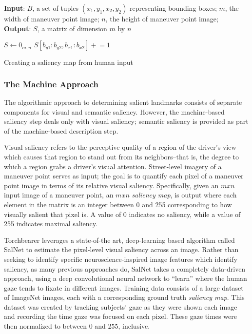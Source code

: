 \begin{algorithm}[htbp]
\textbf{Input}: $B$, a set of tuples $(x_1, y_1, x_2, y_2)$ representing bounding boxes;
$m$, the width of maneuver point image;
$n$, the height of maneuver point image; \\
\textbf{Output}: $S$, a matrix of dimension $m$ by $n$ 
\begin{algorithmic}[1]
\STATE $S\gets 0_{m,n}$
    \STATE $S[b_{y1}:b_{y2}, b_{x1}:b_{x2}] \mathrel{+}= 1$
\ENDFOR
{}
\end{algorithmic}
\caption{Creating a saliency map from human input}\label{alg:saliencyMap}
\label{alg:saliencyMap}
\end{algorithm} 

\subsubsection{The Machine Approach}
The algorithmic approach to determining salient landmarks consists of separate components for visual and semantic saliency. However, the machine-based saliency step deals only with visual saliency; semantic saliency is provided as part of the machine-based description step.

Visual saliency refers to the perceptive quality of a region of the driver’s view which causes that region to stand out from its neighbors--that is, the degree to which a region grabs a driver’s visual attention. Street-level imagery of a maneuver point serves as input; the goal is to quantify each pixel of a maneuver point image in terms of its relative visual saliency. Specifically, given an $m x n$ input image of a maneuver point, an $m x n$ \textit{saliency map}, is output where each element in the matrix is an integer between 0 and 255 corresponding to how visually salient that pixel is. A value of 0 indicates no saliency, while a value of 255 indicates maximal saliency.

Torchbearer leverages a state-of-the art, deep-learning based algorithm called SalNet \cite{Pan_2016_CVPR} to estimate the pixel-level visual saliency across an image. Rather than seeking to identify specific neuroscience-inspired image features which identify saliency, as many previous approaches do, SalNet takes a completely data-driven approach, using a deep convolutional neural network to “learn” where the human gaze tends to fixate in different images. Training data consists of a large dataset of ImageNet \cite{imagenet_cvpr09} images, each with a corresponding ground truth \textit{saliency map}. This dataset was created by tracking subjects’ gaze as they were shown each image and recording the time gaze was focused on each pixel. These gaze times were then normalized to between 0 and 255, inclusive.

